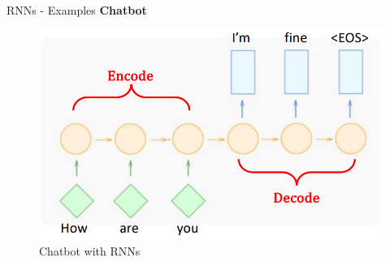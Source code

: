 \begin{frame}[allowframebreaks]{RNNs - Examples}
\framebreak
\textbf{Chatbot}
\begin{figure}
    \centering
    \includegraphics[height=0.7\textheight, width=\textwidth, keepaspectratio]{images/arm/chatbot.png}
    \caption{Chatbot with RNNs}
\end{figure}
\end{frame}